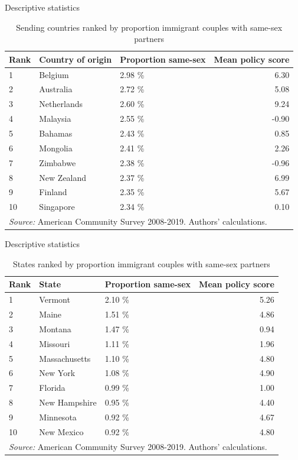 \documentclass[
  ignorenonframetext,
]{beamer}
\begin{document}
\begin{frame}{Descriptive statistics}
\protect\hypertarget{descriptive-statistics-2}{}
\begin{table}

\caption{\label{tab:country-tab}Sending countries ranked by proportion immigrant couples with same-sex partners}
\centering
\fontsize{9}{11}\selectfont
\begin{tabular}[t]{lllr}
\toprule
Rank & Country of origin & Proportion same-sex & Mean policy score\\
\midrule
1 & Belgium & 2.98 \% & 6.30\\
2 & Australia & 2.72 \% & 5.08\\
3 & Netherlands & 2.60 \% & 9.24\\
4 & Malaysia & 2.55 \% & -0.90\\
5 & Bahamas & 2.43 \% & 0.85\\
6 & Mongolia & 2.41 \% & 2.26\\
7 & Zimbabwe & 2.38 \% & -0.96\\
8 & New Zealand & 2.37 \% & 6.99\\
9 & Finland & 2.35 \% & 5.67\\
10 & Singapore & 2.34 \% & 0.10\\
\bottomrule
\multicolumn{4}{l}{\rule{0pt}{1em}\textit{Source:} American Community Survey 2008-2019. Authors' calculations.}\\
\end{tabular}
\end{table}
\end{frame}

\begin{frame}{Descriptive statistics}
\protect\hypertarget{descriptive-statistics-3}{}
\begin{table}

\caption{\label{tab:state-tab}States ranked by proportion immigrant couples with same-sex partners}
\centering
\fontsize{9}{11}\selectfont
\begin{tabular}[t]{lllr}
\toprule
Rank & State & Proportion same-sex & Mean policy score\\
\midrule
1 & Vermont & 2.10 \% & 5.26\\
2 & Maine & 1.51 \% & 4.86\\
3 & Montana & 1.47 \% & 0.94\\
4 & Missouri & 1.11 \% & 1.96\\
5 & Massachusetts & 1.10 \% & 4.80\\
6 & New York & 1.08 \% & 4.90\\
7 & Florida & 0.99 \% & 1.00\\
8 & New Hampshire & 0.95 \% & 4.40\\
9 & Minnesota & 0.92 \% & 4.67\\
10 & New Mexico & 0.92 \% & 4.80\\
\bottomrule
\multicolumn{4}{l}{\rule{0pt}{1em}\textit{Source:} American Community Survey 2008-2019. Authors' calculations.}\\
\end{tabular}
\end{table}
\end{frame}
\end{document}
